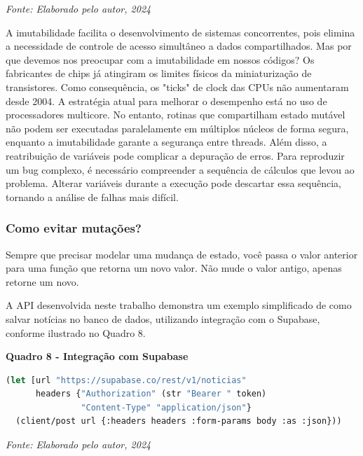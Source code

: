 \begin{center}
    \textit{Fonte: Elaborado pelo autor, 2024} 
\end{center}


A imutabilidade facilita o desenvolvimento de sistemas concorrentes, pois elimina a necessidade de controle de acesso simultâneo a dados compartilhados. Mas por que devemos nos preocupar com a imutabilidade em nossos códigos?
Os fabricantes de chips já atingiram os limites físicos da miniaturização de transistores. Como consequência, os "ticks" de clock das CPUs não aumentaram desde 2004. A estratégia atual para melhorar o desempenho está no uso de processadores multicore. No entanto, rotinas que compartilham estado mutável não podem ser executadas paralelamente em múltiplos núcleos de forma segura, enquanto a imutabilidade garante a segurança entre threads.
Além disso, a reatribuição de variáveis pode complicar a depuração de erros. Para reproduzir um bug complexo, é necessário compreender a sequência de cálculos que levou ao problema. Alterar variáveis durante a execução pode descartar essa sequência, tornando a análise de falhas mais difícil.


\subsubsection*{Como evitar mutações?}
Sempre que precisar modelar uma mudança de estado, você passa o valor anterior para uma função que retorna um novo valor. Não mude o valor antigo, apenas retorne um novo.

A API desenvolvida neste trabalho demonstra um exemplo simplificado de como salvar notícias no banco de dados, utilizando integração com o Supabase, conforme ilustrado no Quadro 8.


\begin{center}
    \textbf{Quadro 8 - Integração com Supabase}
\end{center}

\begin{tcolorbox}[colback=gray!5!white, colframe=gray!75!black, title=]
\begin{lstlisting}[language=Lisp]
(let [url "https://supabase.co/rest/v1/noticias"
      headers {"Authorization" (str "Bearer " token)
               "Content-Type" "application/json"}
  (client/post url {:headers headers :form-params body :as :json}))
\end{lstlisting}
\end{tcolorbox}

\begin{center}
    \textit{Fonte: Elaborado pelo autor, 2024} %
\end{center}


